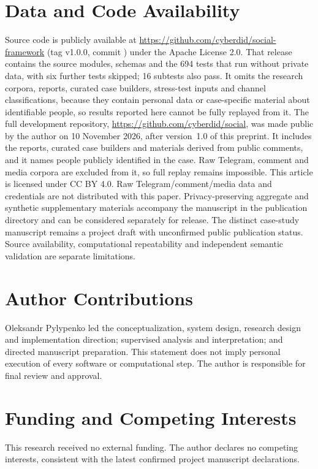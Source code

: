 \section*{Data and Code Availability}
Source code is publicly available at \url{https://github.com/cyberdid/social-framework} (tag v1.0.0, commit ) under the Apache License 2.0. That release contains the source modules, schemas and the 694 tests that run without private data, with six further tests skipped; 16 subtests also pass. It omits the research corpora, reports, curated case builders, stress-test inputs and channel classifications, because they contain personal data or case-specific material about identifiable people, so results reported here cannot be fully replayed from it. The full development repository, \url{https://github.com/cyberdid/social}, was made public by the author on 10 November 2026, after version~1.0 of this preprint. It includes the reports, curated case builders and materials derived from public comments, and it names people publicly identified in the case. Raw Telegram, comment and media corpora are excluded from it, so full replay remains impossible. This article is licensed under CC BY 4.0. Raw Telegram/comment/media data and credentials are not distributed with this paper. Privacy-preserving aggregate and synthetic supplementary materials accompany the manuscript in the publication directory and can be considered separately for release. The distinct case-study manuscript remains a project draft with unconfirmed public publication status. Source availability, computational repeatability and independent semantic validation are separate limitations.

\section*{Author Contributions}
Oleksandr Pylypenko led the conceptualization, system design, research design and implementation direction; supervised analysis and interpretation; and directed manuscript preparation. This statement does not imply personal execution of every software or computational step. The author is responsible for final review and approval.

\section*{Funding and Competing Interests}
This research received no external funding. The author declares no competing interests, consistent with the latest confirmed project manuscript declarations.

